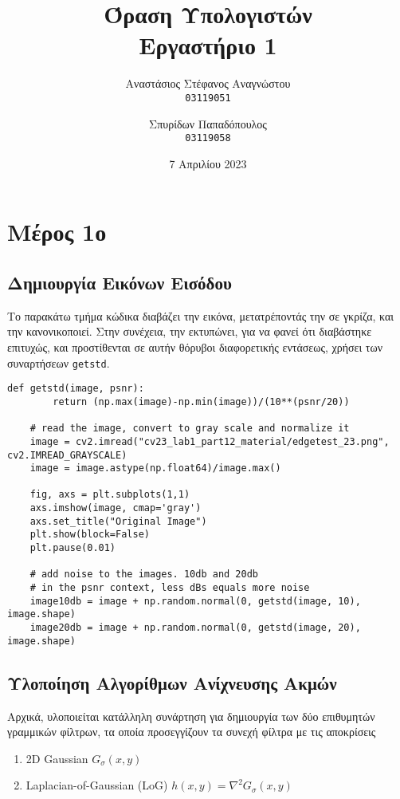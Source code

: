 \documentclass{article}
\title{Όραση Υπολογιστών\\
        \large Εργαστήριο 1}
\author{Αναστάσιος Στέφανος Αναγνώστου\\
    \texttt{03119051}
        \and
        Σπυρίδων Παπαδόπουλος\\
    \texttt{03119058}}
\date{7 Απριλίου 2023}
\newcommand{\eng}[1]{\foreignlanguage{english}{#1}}
\begin{document}
\maketitle

\section{Μέρος 1ο}

\subsection{Δημιουργία Εικόνων Εισόδου}

Το παρακάτω τμήμα κώδικα διαβάζει την εικόνα, μετατρέποντάς την σε γκρίζα, και την κανονικοποιεί. Στην συνέχεια, την εκτυπώνει, για να φανεί ότι διαβάστηκε επιτυχώς, και προστίθενται σε αυτήν θόρυβοι διαφορετικής εντάσεως, χρήσει των συναρτήσεων \eng{\texttt{getstd}}.

\begin{lstlisting}[breaklines=true, showstringspaces=false]
    def getstd(image, psnr):
        return (np.max(image)-np.min(image))/(10**(psnr/20))

    # read the image, convert to gray scale and normalize it
    image = cv2.imread("cv23_lab1_part12_material/edgetest_23.png", cv2.IMREAD_GRAYSCALE)
    image = image.astype(np.float64)/image.max()

    fig, axs = plt.subplots(1,1)
    axs.imshow(image, cmap='gray')
    axs.set_title("Original Image")
    plt.show(block=False)
    plt.pause(0.01)

    # add noise to the images. 10db and 20db
    # in the psnr context, less dBs equals more noise
    image10db = image + np.random.normal(0, getstd(image, 10), image.shape)
    image20db = image + np.random.normal(0, getstd(image, 20), image.shape)
\end{lstlisting}

\subsection{Υλοποίηση Αλγορίθμων Ανίχνευσης Ακμών}

Αρχικά, υλοποιείται κατάλληλη συνάρτηση για δημιουργία των δύο επιθυμητών γραμμικών φίλτρων, τα οποία προσεγγίζουν τα συνεχή φίλτρα με τις αποκρίσεις
\begin{enumerate}
    \item \eng{2D Gaussian} $G_{\sigma}(x, y)$
    \item\eng{ Laplacian-of-Gaussian (LoG)}  $h(x, y) = \nabla^2 G_{\sigma}(x, y)$
\end{enumerate}
\end{document}
